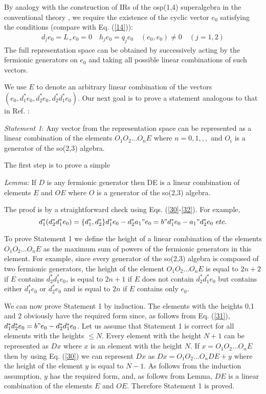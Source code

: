 \documentclass[a4paper,12pt]{article}%
\begin{document}
By analogy with the construction of IRs of the osp(1,4)
superalgebra in the conventional theory \cite{Heidenreich},
we require the existence of the cyclic vector $e_0$ satisfying the
conditions (compare with Eq. (\ref{14})):
\begin{eqnarray}
d_je_0=L_+e_0=0 \quad h_je_0=q_je_0\quad (e_0,e_0)\neq 0\quad (j=1,2)
\label{32}
\end{eqnarray}
The full representation space can be obtained by successively
acting by the fermionic generators on $e_0$ and taking all
possible linear combinations of such vectors.

We use $E$ to denote an arbitrary linear combination of the 
vectors $(e_0,d_1^*e_0,d_2^*e_0,d_2^*d_1^*e_0)$. Our next goal
is to prove a statement analogous to that in Ref. 
\cite{Heidenreich}: 

{\it Statement 1}: Any vector from the representation
space can be represented as a linear combination of the
elements $O_1O_2...O_nE$ where $n=0,1,,,$ and $O_i$ is a
generator of the so(2,3) algebra.

The first step is to prove a simple

{\it Lemma:} If $D$ is any fermionic generator then DE is a 
linear combination of elements $E$ and $OE$ where $O$ is a
generator of the so(2,3) algebra.

The proof is by a straightforward check using Eqs. 
(\ref{30}-\ref{32}). For example,
$$d_1^*(d_2^*d_1^*e_0)=\{d_1^*,d_2^*\}d_1^*e_0-d_2^*a_1"e_0=
b"d_1^*e_0-a_1"d_2^*e_0\,\, etc.$$

To prove Statement 1 we define the height of
a linear combination of the elements $O_1O_2...O_nE$ as the
maximum sum of powers of the fermionic generators in this
element. For example, since every generator of the so(2,3)
algebra is composed of two fermionic generators, the height
of the element $O_1O_2...O_nE$ is equal to $2n+2$ if $E$
contains $d_2^*d_1^*e_0$, is equal to $2n+1$ if $E$ does 
not contain $d_2^*d_1^*e_0$ but contains either $d_1^*e_0$ 
or $d_2^*e_0$ and is equal to $2n$ if $E$ contains only $e_0$.

We can now prove Statement 1 by induction. The elements
with the heights 0,1 and 2 obviously have the required form
since, as follows from Eq. (\ref{31}),
$d_1^*d_2^*e_0=b"e_0-d_2^*d_1^*e_0$. Let us assume that
Statement 1
is correct for all elements with the heights $\leq N$. 
Every element with the height $N+1$ can be represented as
$Dx$ where $x$ is an element with the height $N$. 
If $x=O_1O_2...O_nE$ then by using 
Eq. (\ref{30}) we can represent $Dx$ as $Dx=O_1O_2...O_nDE+y$
where the height of the element $y$ is equal to $N-1$. 
As follows from the induction assumption, $y$ has the required
form, and, as follows from Lemma, $DE$ is a linear
combination of the elements $E$ and $OE$. Therefore 
Statement 1 is proved.
\end{document}
